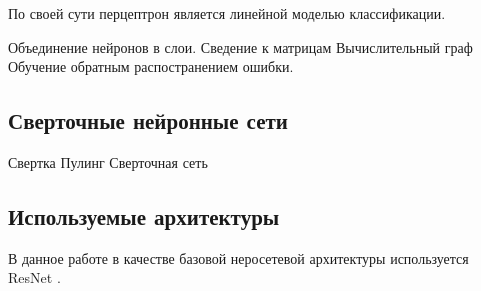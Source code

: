 \indent
По своей сути перцептрон является линейной моделью классификации. 
 
 Объединение нейронов в слои.
 Сведение к матрицам
 Вычислительный граф
 Обучение обратным распостранением ошибки.
 
 
\subsection{Сверточные нейронные сети}
Свертка
Пулинг
Сверточная сеть


\subsection{Используемые архитектуры}
В данное работе в качестве базовой неросетевой архитектуры используется
ResNet \cite{resnet}.
